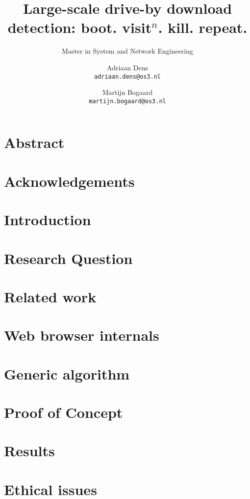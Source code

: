 \documentclass{scrartcl}
\title{Large-scale drive-by download detection: boot. visit$^n$. kill. repeat.}
\subtitle{Master in System and Network Engineering}
\author{
  Adriaan Dens\\
   \texttt{adriaan.dens@os3.nl}
  \and
  Martijn Bogaard\\
   \texttt{martijn.bogaard@os3.nl}
}
\begin{document}
\maketitle

\tableofcontents

\section{Abstract}

\section{Acknowledgements}

\section{Introduction}


\section{Research Question}


\section{Related work}


\section{Web browser internals}

\section{Generic algorithm}

\section{Proof of Concept}

\section{Results}

\section{Ethical issues}




\end{document}
